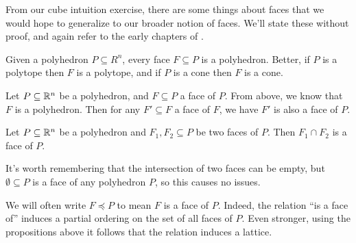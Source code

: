 \documentclass[12pt,oneside]{../../sfsuthesis}
\begin{document}
From our cube intuition exercise, there are some things about faces that we would hope to generalize to our broader notion of faces.
We'll state these without proof, and again refer to the early chapters of \cite{zieglerLecturesPolytopes1995}.
\begin{proposition}
    Given a polyhedron \( P \subseteq R^n \), every face \( F \subseteq P \) is a polyhedron.
    Better, if \( P \) is a polytope then \( F \) is a polytope, and if \( P \) is a cone then \( F \) is a cone.
\end{proposition}
\begin{proposition}
    Let \( P \subseteq \mathbb{R}^n \) be a polyhedron, and \( F \subseteq P \) a face of \( P \).
    From above, we know that \( F \) is a polyhedron.
    Then for any \( F' \subseteq F \) a face of \( F \), we have \( F' \) is also a face of \( P \).
\end{proposition}
\begin{proposition}
    Let \( P \subseteq \mathbb{R}^n \) be a polyhedron and \( F_1, F_2 \subseteq P \) be two faces of \( P \).
    Then \( F_1 \cap F_2 \) is a face of \( P \).
\end{proposition}
It's worth remembering that the intersection of two faces can be empty, but \( \emptyset \subseteq P \) is a face of any polyhedron \( P \), so this causes no issues.

We will often write \( F \preceq P \) to mean \( F \) is a face of \( P \).
Indeed, the relation ``is a face of'' induces a partial ordering on the set of all faces of \( P \).
Even stronger, using the propositions above it follows that the relation induces a lattice.
\end{document}
